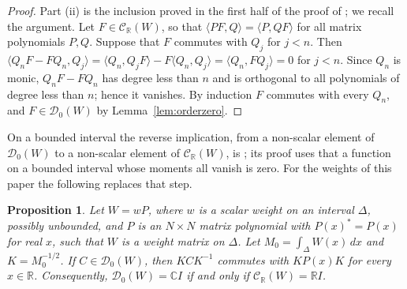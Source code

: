 \documentclass[11pt]{amsart}
\newtheorem{proposition}[theorem]{Proposition}
\theoremstyle{definition}
\theoremstyle{remark}
\numberwithin{equation}{section}
\newcommand{\C}{\mathbb{C}}
\newcommand{\R}{\mathbb{R}}
\newcommand{\cD}{\mathcal{D}}
\newcommand{\CR}{\mathcal{C}_{\R}}
\newcommand{\ip}[2]{\langle #1,#2\rangle}
\begin{document}
\begin{proof}
Part (ii) is the inclusion proved in the first half of the proof of
\cite[Theorem~4.2]{TZ18}; we recall the argument. Let $F\in\CR(W)$, so that
$\ip{PF}{Q}=\ip{P}{QF}$ for all matrix polynomials $P,Q$. Suppose that $F$
commutes with $Q_j$ for $j<n$. Then
$\ip{Q_nF-FQ_n}{Q_j}=\ip{Q_n}{Q_jF}-F\ip{Q_n}{Q_j}=\ip{Q_n}{FQ_j}=0$ for
$j<n$. Since $Q_n$ is monic, $Q_nF-FQ_n$ has degree less than $n$ and is
orthogonal to all polynomials of degree less than $n$; hence it vanishes.
By induction $F$ commutes with every $Q_n$, and $F\in\cD_0(W)$ by
Lemma~\ref{lem:orderzero}.
\end{proof}

On a bounded interval the reverse implication, from a non-scalar element of
$\cD_0(W)$ to a non-scalar element of $\CR(W)$, is
\cite[Theorems~4.2 and~4.3]{TZ18}; its proof uses that a function on a
bounded interval whose moments all vanish is zero. For the weights of this
paper the following replaces that step.

\begin{proposition}\label{prop:bridge}
Let $W=wP$, where $w$ is a scalar weight on an interval $\Delta$, possibly
unbounded, and $P$ is an $N\times N$ matrix polynomial with $P(x)^*=P(x)$
for real $x$, such that $W$ is a weight matrix on $\Delta$. Let
$M_0=\int_\Delta W(x)\,dx$ and $K=M_0^{-1/2}$. If $C\in\cD_0(W)$, then
$KCK^{-1}$ commutes with $KP(x)K$ for every $x\in\R$. Consequently,
$\cD_0(W)=\C I$ if and only if $\CR(W)=\R I$.
\end{proposition}
\end{document}
